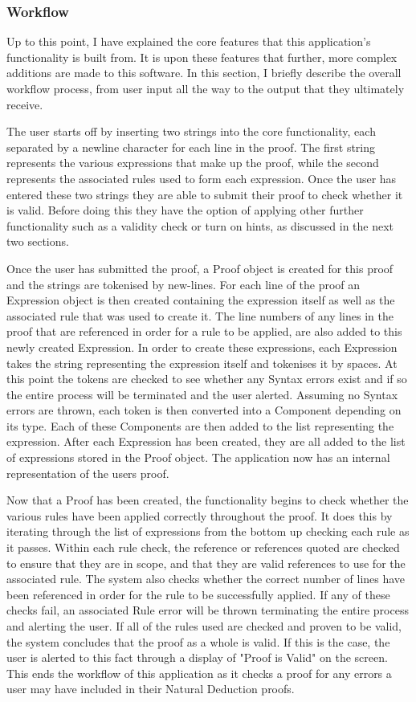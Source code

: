 \subsubsection{Workflow}
Up to this point, I have explained the core features that this application's functionality is built from. It is upon these features that further, more complex additions are made to this software. In this section, I briefly describe the overall workflow process, from user input all the way to the output that they ultimately receive.

The user starts off by inserting two strings into the core functionality, each separated by a newline character for each line in the proof. The first string represents the various expressions that make up the proof, while the second represents the associated rules used to form each expression. Once the user has entered these two strings they are able to submit their proof to check whether it is valid. Before doing this they have the option of applying other further functionality such as a validity check or turn on hints, as discussed in the next two sections.

Once the user has submitted the proof, a Proof object is created for this proof and the strings are tokenised by new-lines. For each line of the proof an Expression object is then created containing the expression itself as well as the associated rule that was used to create it. The line numbers of any lines in the proof that are referenced in order for a rule to be applied, are also added to this newly created Expression. In order to create these expressions, each Expression takes the string representing the expression itself and tokenises it by spaces. At this point the tokens are checked to see whether any Syntax errors exist and if so the entire process will be terminated and the user alerted. Assuming no Syntax errors are thrown, each token is then converted into a Component depending on its type. Each of these Components are then added to the list representing the expression. After each Expression has been created, they are all added to the list of expressions stored in the Proof object. The application now has an internal representation of the users proof.

Now that a Proof has been created, the functionality begins to check whether the various rules have been applied correctly throughout the proof. It does this by iterating through the list of expressions from the bottom up checking each rule as it passes. Within each rule check, the reference or references quoted are checked to ensure that they are in scope, and that they are valid references to use for the associated rule. The system also checks whether the correct number of lines have been referenced in order for the rule to be successfully applied. If any of these checks fail, an associated Rule error will be thrown terminating the entire process and alerting the user. If all of the rules used are checked and proven to be valid, the system concludes that the proof as a whole is valid. If this is the case, the user is alerted to this fact through a display of "Proof is Valid" on the screen. This ends the workflow of this application as it checks a proof for any errors a user may have included in their Natural Deduction proofs. 

